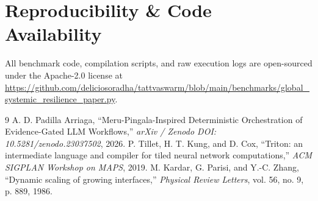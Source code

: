 \documentclass[10pt,twocolumn]{article}
\begin{document}
\section*{Reproducibility \& Code Availability}
All benchmark code, compilation scripts, and raw execution logs are open-sourced under the Apache-2.0 license at \url{https://github.com/deliciosoradha/tattvaswarm/blob/main/benchmarks/global_systemic_resilience_paper.py}.

\begin{thebibliography}{9}
A. D. Padilla Arriaga, ``Meru-Pingala-Inspired Deterministic Orchestration of Evidence-Gated LLM Workflows,'' \textit{arXiv / Zenodo DOI: 10.5281/zenodo.23037502}, 2026.
P. Tillet, H. T. Kung, and D. Cox, ``Triton: an intermediate language and compiler for tiled neural network computations,'' \textit{ACM SIGPLAN Workshop on MAPS}, 2019.
M. Kardar, G. Parisi, and Y.-C. Zhang, ``Dynamic scaling of growing interfaces,'' \textit{Physical Review Letters}, vol. 56, no. 9, p. 889, 1986.
\end{thebibliography}
\end{document}
